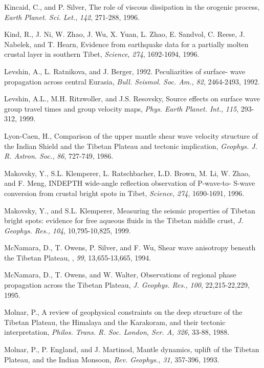 \documentclass[12pt]{article}
\begin{document}
\begin{references}
Kincaid, C., and P. Silver, The role of viscous dissipation in the orogenic
process, {\it Earth Planet. Sci. Let.}, {\it 142}, 271-288, 1996.

Kind, R., J. Ni, W. Zhao, J. Wu, X. Yuan, L. Zhao, E. Sandvol, C. Reese,
J. Nabelek, and T. Hearn, Evidence from earthquake data for a partially
molten crustal layer in southern Tibet, {\it Science,} {\it 274}, 1692-1694,
1996.

Levshin, A., L. Ratnikova, and J. Berger, 1992. Peculiarities of surface-
wave propagation across central Eurasia, {\it Bull. Seismol. Soc. Am.,}
{\it 82}, 2464-2493, 1992.

Levshin, A.L., M.H. Ritzwoller, and J.S. Resovsky, Source effects on
surface wave group travel times and group velocity maps, {\it Phys.
Earth Planet. Int.}, {\it 115}, 293-312, 1999.

Lyon-Caen, H., Comparison of the upper mantle shear wave velocity
structure of the Indian Shield and the Tibetan Plateau and tectonic
implication, {\it Geophys. J. R. Astron. Soc.,} {\it 86}, 727-749, 1986.

Makovsky, Y., S.L. Klemperer, L. Ratschbacher, L.D. Brown, M. Li, W. Zhao,
and F. Meng, INDEPTH wide-angle reflection observation of P-wave-to-
S-wave conversion from crustal bright spots in Tibet, {\it Science,} {\it 274},
1690-1691, 1996.

Makovsky, Y., and S.L. Klemperer, Measuring the seismic properties
of Tibetan bright spots: evidence for free aqueous fluids in the Tibetan
middle crust, {\it J. Geophys. Res.,} {\it 104}, 10,795-10,825, 1999.

McNamara, D., T. Owens, P. Silver, and F. Wu, Shear wave
anisotropy beneath the Tibetan
Plateau, \jgr, {\it 99}, 13,655-13,665, 1994.

McNamara, D., T. Owens, and W. Walter, Observations of
regional phase propagation across the Tibetan Plateau, {\it J. Geophys. Res.,}
{\it 100}, 22,215-22,229, 1995.

Molnar, P., A review of geophysical constraints on the deep structure
of the Tibetan Plateau, the Himalaya and the Karakoram, and their tectonic
interpretation, {\it Philos. Trans. R. Soc. London, Ser. A,} {\it 326}, 33-88,
1988.

Molnar, P., P. England, and J. Martinod, Mantle dynamics, uplift of the
Tibetan Plateau, and the Indian Monsoon, {\it Rev. Geophys., 31}, 357-396, 1993.


\end{references}
\end{document}
